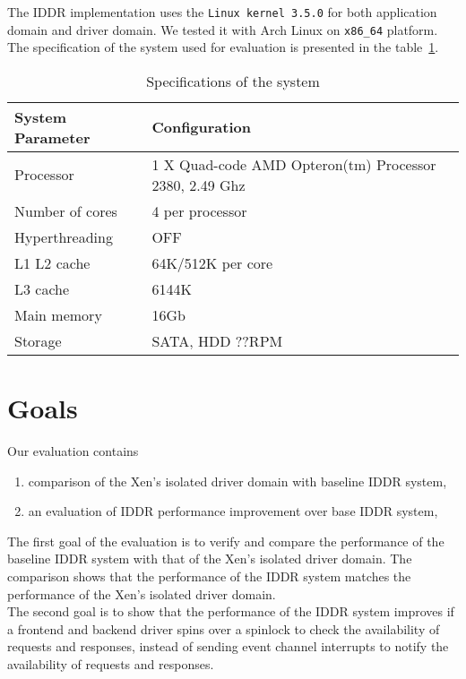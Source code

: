 The IDDR implementation uses the \texttt{Linux kernel 3.5.0} for both application domain and driver domain. We tested it with Arch Linux on \texttt{x86\_64} platform. The specification of the system used for evaluation is presented in the table~\ref{tab:config}. 

\begin{table}
\caption{Specifications of the system}
\begin{tabular}{ll}
  \hline
  \label{tab:config}
  System Parameter & Configuration \\
  \hline
  Processor & 1 X Quad-code AMD Opteron(tm) Processor 2380, 2.49 Ghz \\
  Number of cores & 4 per processor \\
  Hyperthreading & OFF \\
  L1 L2 cache & 64K/512K per core \\
  L3 cache & 6144K \\
  Main memory & 16Gb \\
  Storage & SATA, HDD ??RPM \\
  \hline 
\end{tabular}
\end{table}
 

\section{Goals}
\label{sec:goals}
Our evaluation contains 
\begin{enumerate} 
\item comparison of the Xen's isolated driver domain with baseline IDDR system, 
\item an evaluation of IDDR performance improvement over base IDDR system,
\end{enumerate}
The first goal of the evaluation is to verify and compare the performance of the baseline IDDR system with that of the Xen's isolated driver domain. The comparison shows that the performance of the IDDR system matches the performance of the Xen's isolated driver domain. 
\\[3mm] 
The second goal is to show that the performance of the IDDR system improves if a frontend and backend driver spins over a spinlock to check the availability of requests and responses, instead of sending event channel interrupts to notify the availability of requests and responses. 

